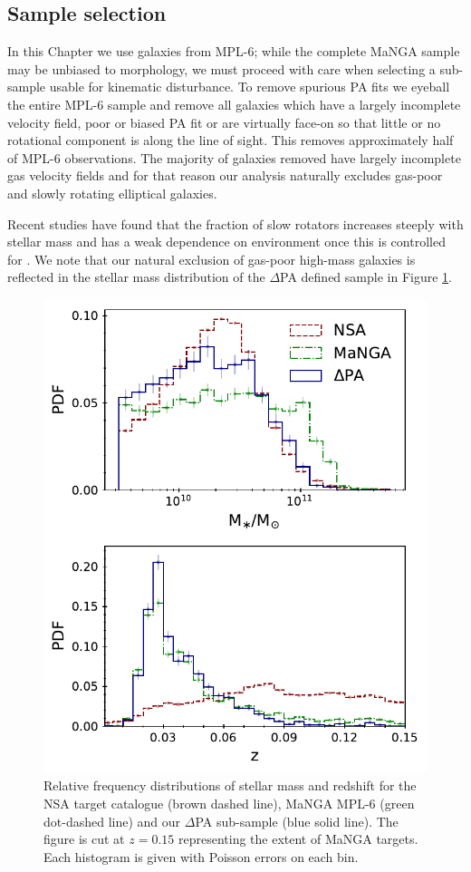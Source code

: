 \subsection{Sample selection} \label{sec:samp_sec}
In this Chapter we use galaxies from MPL-6; while the complete MaNGA sample may be unbiased to morphology, we must proceed with care when selecting a sub-sample usable for kinematic disturbance. To remove spurious PA fits we eyeball the entire MPL-6 sample and remove all galaxies which have a largely incomplete velocity field, poor or biased PA fit or are virtually face-on so that little or no rotational component is along the line of sight. This removes approximately half of MPL-6 observations. The majority of galaxies removed have largely incomplete gas velocity fields and for that reason our analysis naturally excludes gas-poor and slowly rotating elliptical galaxies. 

Recent studies have found that the fraction of slow rotators increases steeply with stellar mass and has a weak dependence on environment once this is controlled for \citep[e.g.][]{greene2018,lagos2018}. We note that our natural exclusion of gas-poor high-mass galaxies is reflected in the stellar mass distribution of the $\Delta$PA defined sample in Figure \ref{fig:samp_cons}.

\begin{figure}
    \centering
	\includegraphics[width=0.6\linewidth]{thesis/latex/halo_assembly_manga/sample_consistency.pdf}
    \caption[Relative frequency distributions of stellar mass and redshift for the NSA target catalogue, MaNGA MPL-6 and $\Delta$PA sub-samples.]{Relative frequency distributions of stellar mass and redshift for the NSA target catalogue (brown dashed line), MaNGA MPL-6 (green dot-dashed line) and our $\Delta$PA sub-sample (blue solid line). The figure is cut at $z=0.15$ representing the extent of MaNGA targets. Each histogram is given with Poisson errors on each bin.}
    \label{fig:samp_cons}
\end{figure}

